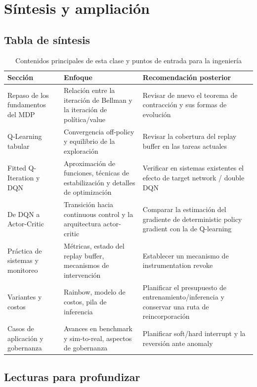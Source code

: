 \section{Síntesis y ampliación}

\subsection{Tabla de síntesis}

\begin{table}[H]
\centering
\begin{tabular}{lp{8cm}p{4cm}}
\toprule
Sección & Enfoque & Recomendación posterior \\
\midrule
Repaso de los fundamentos del MDP & Relación entre la iteración de Bellman y la iteración de política/value & Revisar de nuevo el teorema de contracción y sus formas de evolución \\
Q-Learning tabular & Convergencia off-policy y equilibrio de la exploración & Revisar la cobertura del replay buffer en las tareas actuales \\
Fitted Q-Iteration y DQN & Aproximación de funciones, técnicas de estabilización y detalles de optimización & Verificar en sistemas existentes el efecto de target network / double DQN \\
De DQN a Actor-Critic & Transición hacia continuous control y la arquitectura actor-critic & Comparar la estimación del gradiente de deterministic policy gradient con la de Q-learning \\
Práctica de sistemas y monitoreo & Métricas, estado del replay buffer, mecanismos de intervención & Establecer un mecanismo de instrumentation revoke \\
Variantes y costos & Rainbow, modelo de costos, pila de inferencia & Planificar el presupuesto de entrenamiento/inferencia y conservar una ruta de reincorporación \\
Casos de aplicación y gobernanza & Avances en benchmark y sim-to-real, aspectos de gobernanza & Planificar soft/hard interrupt y la reversión ante anomaly \\
\bottomrule
\end{tabular}
\caption{Contenidos principales de esta clase y puntos de entrada para la ingeniería}
\end{table}

\subsection{Lecturas para profundizar}

